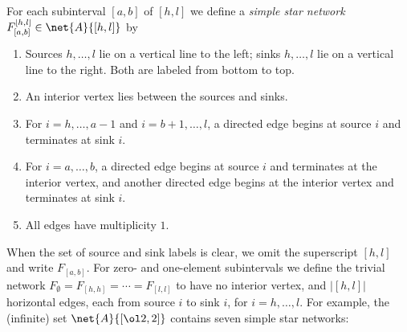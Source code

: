 For each subinterval $[a,b]$ of $[h,l]$ we define a {\em simple star network}
$\smash{F_{[a,b]}^{[h,l]}} \in \net{A}{[h,l]}$ by
\begin{enumerate}
\item Sources $h,\dotsc,l$ lie on a vertical line to the left;
  sinks $h,\dotsc,l$ lie on a vertical line to the right.
  Both are labeled from bottom to top.
\item An interior vertex lies between the sources and sinks.
\item For $i = h, \dotsc, a-1$ and $i = b+1, \dotsc, l$, a directed edge
  begins at source $i$ and terminates at sink $i$.
\item For $i = a, \dotsc, b$, a directed edge begins at source $i$ and
  terminates at the interior vertex, and another directed edge begins
  at the interior vertex and terminates at sink $i$.
\item All edges have multiplicity $1$.
\end{enumerate}
When the set of source and sink labels is clear,
we omit the superscript $[h,l]$ and write $F_{[a,b]}$.
For zero- and one-element subintervals
we define the trivial network $F_{\emptyset} = F_{[h,h]} = \cdots = F_{[l,l]}$
to have no interior vertex, and $|[h,l]|$ horizontal edges, each from source $i$
to sink $i$, for $i = h,\dotsc,l$.
For example,
the (infinite) set $\net{A}{[\ol2, 2]}$ contains
seven simple star networks:
